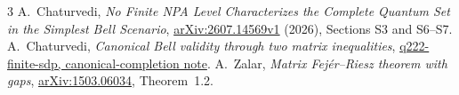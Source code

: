 \documentclass[11pt]{article}
\begin{document}
\begin{thebibliography}{3}\small
{} A.~Chaturvedi,
\emph{No Finite NPA Level Characterizes the Complete Quantum Set
in the Simplest Bell Scenario},
\href{https://arxiv.org/abs/2607.14569}{arXiv:2607.14569v1} (2026),
Sections S3 and S6--S7.
 A.~Chaturvedi,
\emph{Canonical Bell validity through two matrix inequalities},
\href{https://github.com/anubhav70747/q222-finite-sdp/tree/main/extracted-lifts/canonical-completion}{q222-finite-sdp, canonical-completion note}.
 A.~Zalar,
\emph{Matrix Fej\'er--Riesz theorem with gaps},
\href{https://arxiv.org/abs/1503.06034}{arXiv:1503.06034}, Theorem~1.2.
\end{thebibliography}
\end{document}

